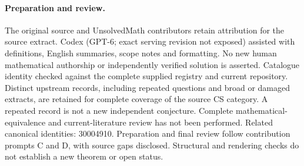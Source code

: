 \documentclass[11pt]{article}
\begin{document}
\paragraph{Preparation and review.}
The original source and UnsolvedMath contributors retain attribution for the source extract. Codex (GPT-6; exact serving revision not exposed) assisted with definitions, English summaries, scope notes and formatting. No new human mathematical authorship or independently verified solution is asserted. Catalogue identity checked against the complete supplied registry and current repository. Distinct upstream records, including repeated questions and broad or damaged extracts, are retained for complete coverage of the source CS category. A repeated record is not a new independent conjecture. Complete mathematical-equivalence and current-literature review has not been performed. Related canonical identities: 30004910. Preparation and final review follow contribution prompts C and D, with source gaps disclosed. Structural and rendering checks do not establish a new theorem or open status.
\label{end:statement}
\end{document}
